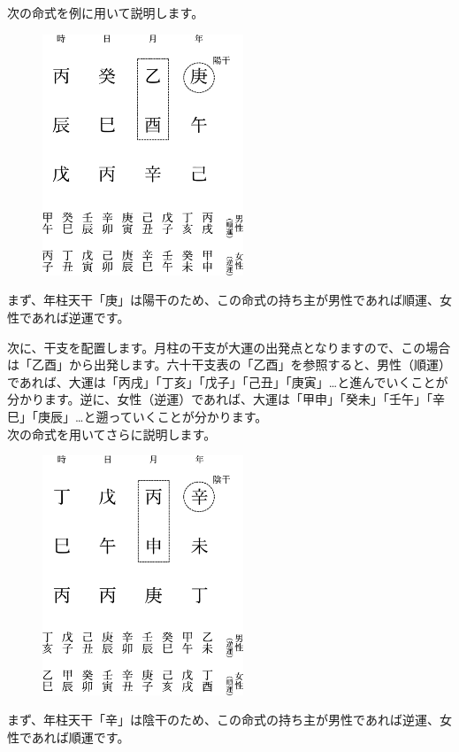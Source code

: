 \documentclass[a5paper,11pt,dvipdfmx]{tarticle}
\begin{document}
次の命式を例に用いて説明します。

\begin{figure}[h]
  \includegraphics[width=60mm,angle=90]{figs/figure4-2.eps}
\end{figure}

まず、年柱天干「庚」は陽干のため、この命式の持ち主が男性であれば順運、女性であれば逆運です。

次に、干支を配置します。月柱の干支が大運の出発点となりますので、この場合は「乙酉」から出発します。六十干支表の「乙酉」を参照すると、男性（順運）であれば、大運は「丙戌」「丁亥」「戊子」「己丑」「庚寅」…と進んでいくことが分かります。逆に、女性（逆運）であれば、大運は「甲申」「癸未」「壬午」「辛巳」「庚辰」…と遡っていくことが分かります。\\

次の命式を用いてさらに説明します。

\begin{figure}[h]
  \includegraphics[width=60mm,angle=90]{figs/figure4-3.eps}
\end{figure}

まず、年柱天干「辛」は陰干のため、この命式の持ち主が男性であれば逆運、女性であれば順運です。
\end{document}
